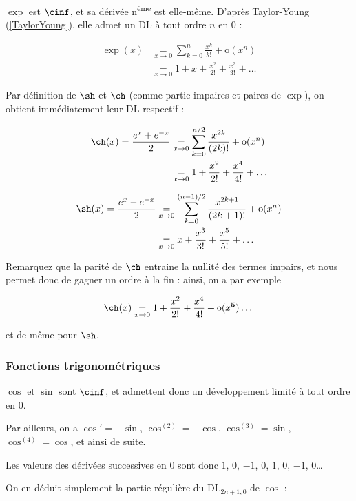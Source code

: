 \documentclass[12pt]{article}
\begin{document}
$\exp$ est $\cinf$, et sa dérivée n\textsuperscript{ème} est
elle-même. D'après Taylor-Young (\ref{TaylorYoung}), elle admet un DL à
tout ordre $n$ en 0 :

\begin{align}
\exp(x)&\underset{x\rightarrow 0}{=}\sum_{k=0}^n \frac{x^k}{k!}+\text{o}(x^n)\\
&\underset{x\rightarrow 0}{=}1+x+\frac{x^2}{2!}+\frac{x^3}{3!}+\dots
\end{align}


Par définition de $\sh$ et $\ch$ (comme partie impaires et paires de
$\exp$), on obtient immédiatement leur DL respectif :

\begin{align}
  \ch(x)=\frac{e^x+e^{-x}}{2}&\underset{x\rightarrow 0}{=}\sum_{k=0}^{n/2} \frac{x^{2k}}{(2k)!}+\text{o}(x^n)\\
  &\underset{x\rightarrow 0}{=}1+\frac{x^2}{2!}+\frac{x^4}{4!}+\dots
\end{align}

\begin{align}
  \sh(x)=\frac{e^x-e^{-x}}{2}&\underset{x\rightarrow 0}{=}\sum_{k=0}^{(n-1)/2} \frac{x^{2k+1}}{(2k+1)!}+\text{o}(x^n)\\
  &\underset{x\rightarrow 0}{=}x+\frac{x^3}{3!}+\frac{x^5}{5!}+\dots
\end{align}


Remarquez que la parité de $\ch$ entraine la nullité des termes impairs,
et nous permet donc de gagner un ordre à la fin : ainsi, on a par exemple 

$$  \ch(x) \underset{x\rightarrow 0}{=}1+\frac{x^2}{2!}+\frac{x^4}{4!}+\text{o}(x^{\mathbf{5}})\dots
$$

et de même pour $\sh$.


\subsubsection{Fonctions trigonométriques}

$\cos$ et $\sin$ sont $\cinf$, et admettent donc un développement limité à
tout ordre en $0$.


Par ailleurs, on a $\cos'=-\sin$, $\cos^{(2)}=-\cos$, $\cos^{(3)}=\sin$,
$\cos^{(4)}=\cos$, et ainsi de suite. 

Les valeurs des dérivées successives
en $0$ sont donc $1$, $0$, $-1$, $0$, $1$, $0$, $-1$, $0$\dots 
 

On en déduit simplement la partie régulière du DL$_{2n+1,0}$ de $\cos$ :
\end{document}
